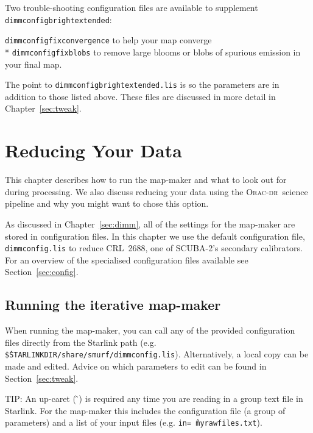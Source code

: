 \documentclass[twoside,11pt]{article}
\newcommand{\htmladdnormallink}[2]{#1}
\newcommand{\htmlref}[2]{#1}
\newenvironment{latexonly}{}{}
\newcommand{\latexhtml}[2]{#1}
\newcommand{\xlabel}[1]{}
\renewcommand{\_}{\texttt{\symbol{95}}}
\newenvironment{fmpage}[1]{\begin{lrbox}{\fmbox}\begin{minipage}{#1}}{\end{minipage}\end{lrbox}\fbox{\usebox{\fmbox}}}
\newcommand{\starlink}{\htmladdnormallink{Starlink}{http://starlink.jach.hawaii.edu}}
\newcommand{\oracdr}{\htmladdnormallink{\textsc{Orac-dr}}{http://www.oracdr.org/oracdr}}
\newcommand{\file}[1]{\texttt{#1}}
\newcommand{\cref}[3]{\latexhtml{#1~\ref{#2}}{\htmlref{#3}{#2}}}
\begin{document}
Two trouble-shooting configuration files are available to supplement
\file{dimmconfig\_bright\_extended}:

\file{dimmconfig\_fix\_convergence} to help your map converge\\*
\file{dimmconfig\_fix\_blobs} to remove large blooms or blobs of
spurious emission in your final map.

The point to \file{dimmconfig\_bright\_extended.lis} is so the parameters
are in addition to those listed above. These files are discussed in more
detail in \cref{Chapter}{sec:tweak}{Tailoring Your Reduction}.

\clearpage

\section{\xlabel{maps}Reducing Your Data}
\label{sec:maps}

This chapter describes how to run the map-maker and what to look out
for during processing. We also discuss reducing your data using the
\oracdr\ science pipeline and why you might want to chose this option.

As discussed in \cref{Chapter}{sec:dimm}{The
Dynamic Iterative Map-Maker}, all of the settings for the map-maker
are stored in configuration files. In this chapter we use
the default configuration file, \file{dimmconfig.lis} to reduce CRL~2688,
one of SCUBA-2's secondary calibrators. For an
overview of the specialised configuration files available see
\cref{Section}{sec:config}{this section}.

\subsection{\xlabel{running_dimm}Running the iterative map-maker}
\label{sec:running}

When running the map-maker, you can call any of the provided
configuration files directly from the Starlink path (e.g.
\file{\^\$STARLINK\_DIR/share/smurf/dimmconfig.lis}). Alternatively,
a local copy can be made and edited. Advice on which parameters to
edit can be found in \cref{Section}{sec:tweak}{Tweaking the
configuration file}.

\begin{latexonly}
\begin{center}
\begin{fmpage}{0.95\linewidth}
\vspace{0.1cm}
TIP: An up-caret (\,\^\,) is required any time you are reading in
a  group text file in \starlink. For the map-maker this includes the
configuration file (a group of parameters) and a list of your input files
(e.g. \texttt{in=\^\,myrawfiles.txt}).
\end{fmpage}
\end{center}
\end{latexonly}
\end{document}
